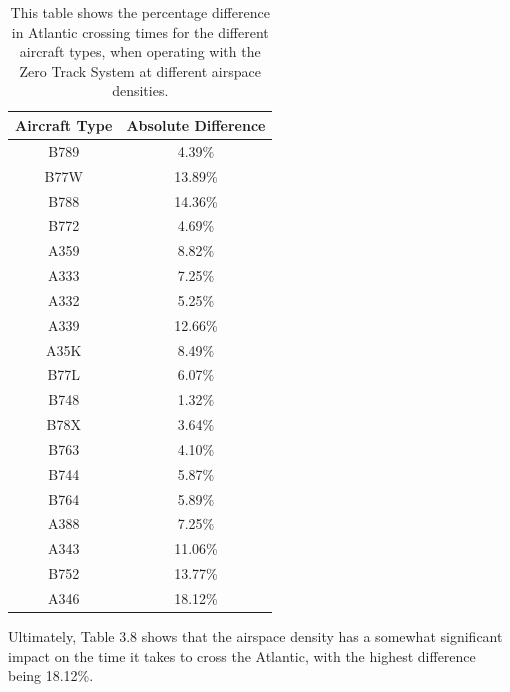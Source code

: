 \documentclass[stu, a4paper, 12pt, floatsintext]{apa7}
\numberwithin{figure}{section}
\numberwithin{table}{section}
\numberwithin{equation}{section}
\begin{document}
\begin{table}[H]
    \centering
    \caption{This table shows the percentage difference in Atlantic crossing times for the different aircraft types, when operating with the Zero Track System at different airspace densities.}
    \label{tab:38}
    \begin{tabular}{@{}cc@{}}
    \toprule
    \textbf{Aircraft Type} & \textbf{Absolute Difference} \\ \midrule
    B789                   & 4.39\%                       \\
    B77W                   & 13.89\%                      \\
    B788                   & 14.36\%                      \\
    B772                   & 4.69\%                       \\
    A359                   & 8.82\%                       \\
    A333                   & 7.25\%                       \\
    A332                   & 5.25\%                       \\
    A339                   & 12.66\%                      \\
    A35K                   & 8.49\%                       \\
    B77L                   & 6.07\%                       \\
    B748                   & 1.32\%                       \\
    B78X                   & 3.64\%                       \\
    B763                   & 4.10\%                       \\
    B744                   & 5.87\%                       \\
    B764                   & 5.89\%                       \\
    A388                   & 7.25\%                       \\
    A343                   & 11.06\%                      \\
    B752                   & 13.77\%                      \\
    A346                   & 18.12\%                      \\ \bottomrule
    \end{tabular}
\end{table}

Ultimately, Table 3.8 shows that the airspace density has a somewhat significant impact on the time it takes to cross the Atlantic, with the highest difference being 18.12\%.  
\end{document}
